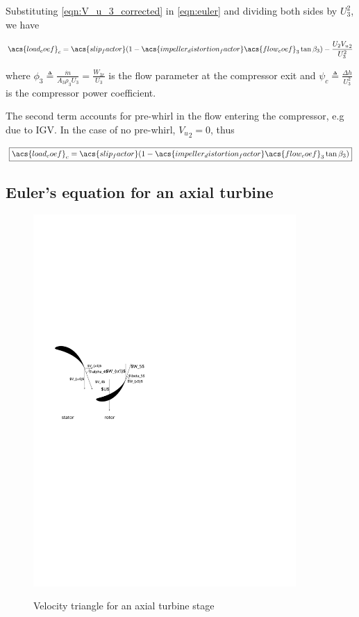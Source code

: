 \documentclass[tcc]{subfiles}
\begin{document}
Substituting \cref{eqn:V_u_3_corrected} in \cref{eqn:euler} and dividing both sides by ${U_3^2}$, we have

\begin{equation}
    \acs{load_coef}_c = \acs{slip_factor}(1-\acs{impeller_distortion_factor}\acs{flow_coef}_3\tan\beta_3) - \frac{U_2 {V_u}_2}{U_3^2} 
\end{equation}

where $\phi_3 \triangleq \frac{\dot{m}}{A_3 \rho_3 U_3} = \frac{W_{3r}}{U_3}$ is the flow parameter at the compressor exit
and $\psi_c \triangleq \frac{\Delta h}{U_3^2}$ is the compressor power coefficient.

The second term accounts for pre-whirl in the flow entering the compressor, e.g due to \ac{IGV}.
In the case of no pre-whirl, ${V_u}_2 = 0$, thus 

\begin{equation}
    \label{eqn:euler}
    \boxed{\acs{load_coef}_c = \acs{slip_factor}(1-\acs{impeller_distortion_factor}\acs{flow_coef}_3\tan\beta_3)}
\end{equation}

\subsection{Euler's equation for an axial turbine}
\begin{figure}
    \centering
    \caption{Velocity triangle for an axial turbine stage}
    \includegraphics[width=10cm]{fig/turbine_euler}
    \label{fig:turbine_euler}
\end{figure}
\end{document}
